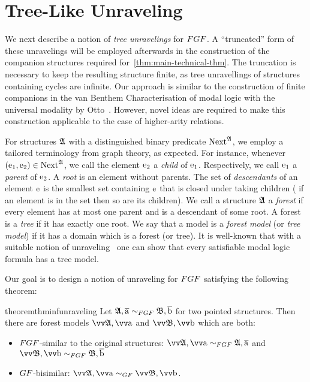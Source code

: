 
\section{Tree-Like Unraveling}\label{sec:unraveling}
We next describe a notion of \emph{tree unravelings} for $\FGF$.
A ``truncated'' form of these unravelings will be employed afterwards in the construction of the companion structures required for~\cref{thm:main-technical-thm}.
The truncation is necessary to keep the resulting structure finite, as tree unravellings of structures containing cycles are infinite.
Our approach is similar to the construction of finite companions in the van Benthem Characterisation of modal logic with the universal modality by Otto~\cite[Proof of Lemma 38]{Otto04}.
However, novel ideas are required to make this construction applicable to the case of higher-arity relations.

For structures ${\mathfrak{A}}$ with a distinguished binary predicate $\mathrm{Next}^{{\mathfrak{A}}}$, we employ a tailored terminology from graph theory, as expected.
For instance, whenever $(\mathrm{e}_1, \mathrm{e}_2) \in \mathrm{Next}^{{\mathfrak{A}}}$, we call the element $\mathrm{e}_2$ a \emph{child} of $\mathrm{e}_1$. Respectively, we call $\mathrm{e}_1$ a \emph{parent} of $\mathrm{e}_2$.
A \emph{root} is an element without parents.
The set of \emph{descendants} of an element $\mathrm{e}$ is the smallest set containing $\mathrm{e}$ that is closed under taking children (\ie{} if an element is in the set then so are its children).
We call a structure ${\mathfrak{A}}$ a \emph{forest} if every element has at most one parent and is a descendant of some root.
A forest is a \emph{tree} if it has exactly one root.
We say that a model is a \emph{forest model} (or \emph{tree model}) if it has a domain which is a forest (or tree).
It is well-known that with a suitable notion of unraveling~\cite[Prop. 3]{Rosen97} one can show that every satisfiable modal logic formula has a tree model.

Our goal is to design a notion of unraveling for $\FGF$ satisfying the following theorem:
\begin{restatable}{theorem}{thminfunraveling}\label{thm:inf-unraveling-upgrading}
  Let $\str{A}, \elemtuplea \bisimto_{\FGF} \str{B}, \elemtupleb$ for two pointed structures.
  Then there are forest models $\unravel{A}, \elemtuptuplea$ and $\unravel{B}, \elemtuptupleb$ which are both:
  \begin{itemize}
    \item $\FGF$-similar to the original structures: $\unravel{A}, \elemtuptuplea \bisimto_{\FGF} \str{A}, \elemtuplea$ and $\unravel{B}, \elemtuptupleb \bisimto_{\FGF} \str{B}, \elemtupleb$
    \item $\GF$-bisimilar: $\unravel{A}, \elemtuptuplea \bisimto_{\GF} \unravel{B}, \elemtuptupleb$.
  \end{itemize}
\end{restatable}

